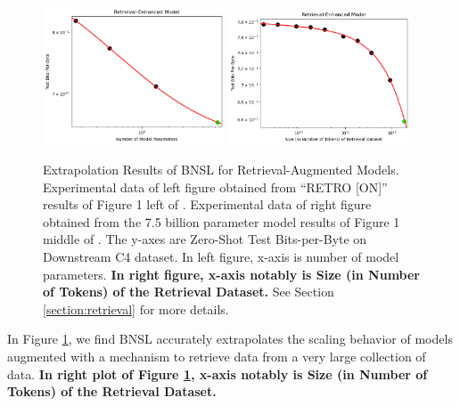 \documentclass{article} %
\begin{document}
\begin{figure}[htbp]
    \centering
\includegraphics[width=0.48\textwidth]{figures/retrieval/retrieval__num_of_parameters.png}
\includegraphics[width=0.48\textwidth]{figures/retrieval/retrieval__retrieval_dataset_size.png}

\vspace{-3.5mm}
    \caption{
Extrapolation Results of BNSL for Retrieval-Augmented Models. Experimental data of left figure obtained from ``RETRO [ON]'' results of Figure 1 left of \cite{borgeaud2022improving}. Experimental data of right figure obtained from the 7.5 billion parameter model results of Figure 1 middle of \cite{borgeaud2022improving}. The y-axes are Zero-Shot Test Bits-per-Byte on Downstream C4 \citep{2019t5} dataset. In left figure, x-axis is number of model parameters. \textbf{In right figure, x-axis notably is Size (in Number of Tokens) of the Retrieval Dataset.} See Section \ref{section:retrieval} for more details.
    }
    \label{fig:retrieval}
\end{figure}

In Figure \ref{fig:retrieval}, we find BNSL accurately extrapolates the scaling behavior of models augmented with a mechanism to retrieve data from a very large collection of data. \textbf{In right plot of Figure \ref{fig:retrieval}, x-axis notably is Size (in Number of Tokens) of the Retrieval Dataset.}


\clearpage
\end{document}
